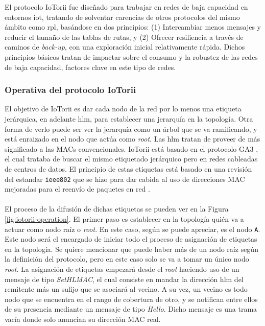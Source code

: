 El protocolo IoTorii fue diseñado para trabajar en redes de baja capacidad en entornos \gls{iot}, tratando de solventar carencias de otros protocolos del mismo ámbito como \gls{rpl}, basándose en dos principios: (1) Intercambiar menos mensajes y reducir el tamaño de las tablas de rutas, y (2) Ofrecer resiliencia a través de caminos de \textit{back-up}, con una exploración inicial relativamente rápida. Dichos principios básicos tratan de impactar sobre el consumo y la robustez de las redes de baja capacidad, factores clave en este tipo de redes.


\subsubsection{Operativa del protocolo IoTorii}

El objetivo de IoTorii es dar cada nodo de la red por lo menos una etiqueta jerárquica, en adelante \gls{hlm}, para establecer una jerarquía en la topología. Otra forma de verlo puede ser ver la jerarquía como un árbol que se va ramificando, y está enraizado en el nodo que actúa como \textit{root}. Las \gls{hlm} tratan de proveer de más significado a las MACs convencionales. IoTorii está basado en el protocolo GA3 \cite{rojas2017ga3}, el cual trataba de buscar el mismo etiquetado jerárquico pero en redes cableadas de centros de datos. El principio de estas etiquetas está basado en una revisión del estandar \texttt{ieee802} que se hizo para dar cabida al uso de direcciones MAC mejoradas para el reenvío de paquetes en red \cite{8016709}.\\
\\
El proceso de la difusión de dichas etiquetas se pueden ver en la Figura \ref{fig:iotorii-operation}. El primer paso es establecer en la topología quién va a actuar como nodo raíz o \textit{root}. En este caso, según se puede apreciar, es el nodo \texttt{A}. Este nodo será el encargado de iniciar todo el proceso de asignación de etiquetas en la topología. Se quiere mencionar que puede haber más de un nodo raíz según la definición del protocolo, pero en este caso solo se va a tomar un único nodo \textit{root}. La asignación de etiquetas empezará desde el \textit{root} haciendo uso de un mensaje de tipo \textit{SetHLMAC}, el cual consiste en mandar la  dirección \gls{hlm} del remitente más un sufijo que se asociará al vecino. A su vez, un vecino es todo nodo que se encuentra en el rango de cobertura de otro, y se notifican entre ellos de su presencia mediante un mensaje de tipo \textit{Hello}. Dicho mensaje es una trama vacía donde solo anuncian su dirección MAC real. \\
